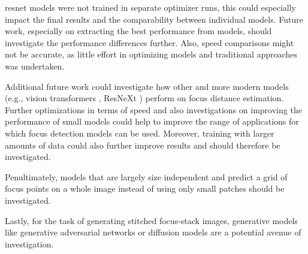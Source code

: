 \Ac{resnet} models were not trained in separate optimizer runs, this could especially impact the final results and the comparability between individual models. Future work, especially on extracting the best performance from models, should investigate the performance differences further. 
Also, speed comparisons might not be accurate, as little effort in optimizing models and traditional approaches was undertaken.

Additional future work could investigate how other and more modern models (e.g., vision transformers \cite{dosovitskiy2021image}, ResNeXt \cite{xie2017aggregated}) perform on focus distance estimation. Further optimizations in terms of speed and also investigations on improving the performance of small models could help to improve the range of applications for which focus detection models can be used.
Moreover, training with larger amounts of data could also further improve results and should therefore be investigated.

Penultimately, models that are largely size independent and predict a grid of focus points on a whole image instead of using only small patches should be investigated.

Lastly, for the task of generating stitched focus-stack images, generative models like generative adversarial networks \cite{goodfellow2014generative} or diffusion models \cite{dhariwal2021diffusion} are a potential avenue of investigation.